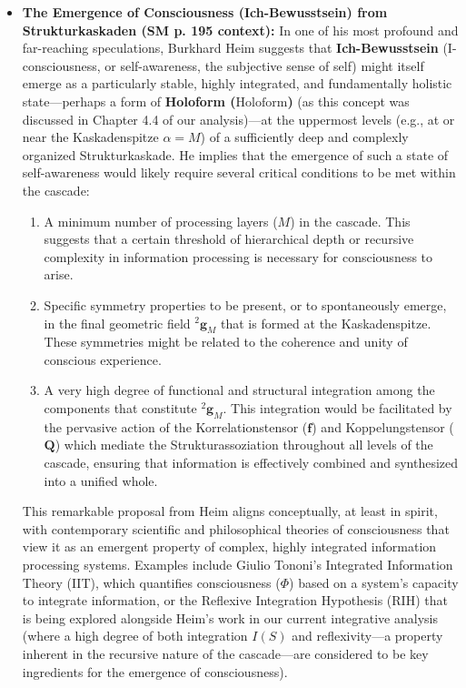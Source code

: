 \documentclass[12pt]{article}
\newcommand{\holoform}{\text{Holoform}}
\newcommand{\kompositionsfeld}{{}^2\mathbf{g}}
\newcommand{\korrelationstensor}{\mathbf{f}}
\newcommand{\koppelungstensor}{\mathbf{Q}}
\newcommand{\kaskadenstufe}{\alpha}
\begin{document}
\begin{itemize}
    \item \textbf{The Emergence of Consciousness (Ich-Bewusstsein) from Strukturkaskaden (SM p. 195 context):}
    In one of his most profound and far-reaching speculations, Burkhard Heim suggests that \textbf{Ich-Bewusstsein} (I-consciousness, or self-awareness, the subjective sense of self) might itself emerge as a particularly stable, highly integrated, and fundamentally holistic state—perhaps a form of \textbf{Holoform (\(\holoform\))} (as this concept was discussed in Chapter 4.4 of our analysis)—at the uppermost levels (e.g., at or near the Kaskadenspitze \( \kaskadenstufe=M \)) of a sufficiently deep and complexly organized Strukturkaskade. He implies that the emergence of such a state of self-awareness would likely require several critical conditions to be met within the cascade:
    \begin{enumerate}
        \item A minimum number of processing layers (\( M \)) in the cascade. This suggests that a certain threshold of hierarchical depth or recursive complexity in information processing is necessary for consciousness to arise.
        \item Specific symmetry properties to be present, or to spontaneously emerge, in the final geometric field \( \kompositionsfeld_M \) that is formed at the Kaskadenspitze. These symmetries might be related to the coherence and unity of conscious experience.
        \item A very high degree of functional and structural integration among the components that constitute \( \kompositionsfeld_M \). This integration would be facilitated by the pervasive action of the Korrelationstensor (\( \korrelationstensor \)) and Koppelungstensor (\( \koppelungstensor \)) which mediate the Strukturassoziation throughout all levels of the cascade, ensuring that information is effectively combined and synthesized into a unified whole.
    \end{enumerate}
    This remarkable proposal from Heim aligns conceptually, at least in spirit, with contemporary scientific and philosophical theories of consciousness that view it as an emergent property of complex, highly integrated information processing systems. Examples include Giulio Tononi's Integrated Information Theory (IIT), which quantifies consciousness (\( \Phi \)) based on a system's capacity to integrate information, or the Reflexive Integration Hypothesis (RIH) that is being explored alongside Heim's work in our current integrative analysis (where a high degree of both integration \( I(S) \) and reflexivity—a property inherent in the recursive nature of the cascade—are considered to be key ingredients for the emergence of consciousness).


\end{itemize}
\end{document}
